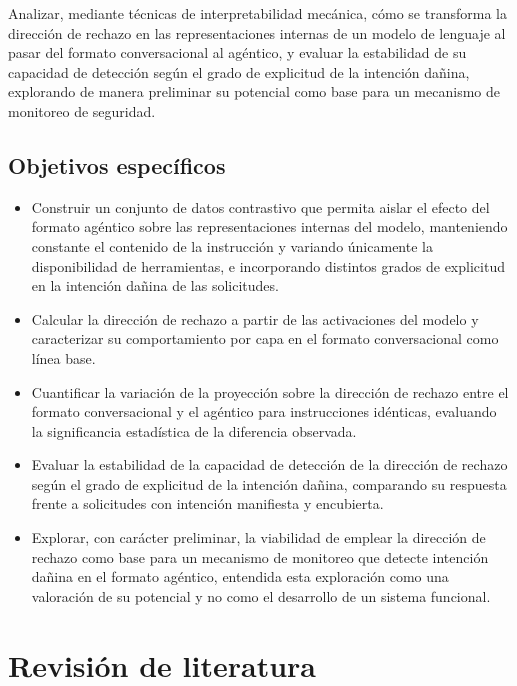 \documentclass[12pt,a4paper]{article}
\begin{document}
\justifying

Analizar, mediante técnicas de interpretabilidad mecánica, cómo se transforma la dirección de rechazo en las representaciones internas de un modelo de lenguaje al pasar del formato conversacional al agéntico, y evaluar la estabilidad de su capacidad de detección según el grado de explicitud de la intención dañina, explorando de manera preliminar su potencial como base para un mecanismo de monitoreo de seguridad.

\subsection{Objetivos específicos}

\begin{itemize}
  \item Construir un conjunto de datos contrastivo que permita aislar el efecto del formato agéntico sobre las representaciones internas del modelo, manteniendo constante el contenido de la instrucción y variando únicamente la disponibilidad de herramientas, e incorporando distintos grados de explicitud en la intención dañina de las solicitudes.

  \item Calcular la dirección de rechazo a partir de las activaciones del modelo y caracterizar su comportamiento por capa en el formato conversacional como línea base.

  \item Cuantificar la variación de la proyección sobre la dirección de rechazo entre el formato conversacional y el agéntico para instrucciones idénticas, evaluando la significancia estadística de la diferencia observada.

  \item Evaluar la estabilidad de la capacidad de detección de la dirección de rechazo según el grado de explicitud de la intención dañina, comparando su respuesta frente a solicitudes con intención manifiesta y encubierta.

  \item Explorar, con carácter preliminar, la viabilidad de emplear la dirección de rechazo como base para un mecanismo de monitoreo que detecte intención dañina en el formato agéntico, entendida esta exploración como una valoración de su potencial y no como el desarrollo de un sistema funcional.
\end{itemize}

\section{Revisión de literatura}
\end{document}
